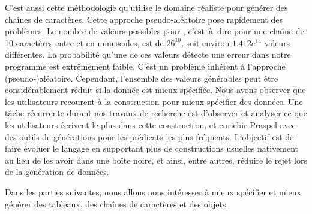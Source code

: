 C'est aussi cette méthodologie qu'utilise le domaine réaliste  pour
générer des chaînes de caractères. Cette approche pseudo-aléatoire pose
rapidement des problèmes. Le nombre de valeurs possibles pour , c'est~à~dire pour une chaîne de 10 caractères entre  et
 en minuscules, est de $26^{10}$, soit environ $1.412e^{14}$ valeurs
différentes. La probabilité qu'une de ces valeurs détecte une erreur dans notre
programme est extrêmement faible. C'est un problème inhérent à l'approche
(pseudo-)aléatoire. Cependant, l'ensemble des valeurs générables peut être
considérablement réduit si la donnée est mieux spécifiée. Nous avons observer
que les utilisateurs recourent à la construction  pour mieux spécifier
des données. Une tâche récurrente durant nos travaux de recherche est d'observer
et analyser ce que les utilisateurs écrivent le plus dans cette construction, et
enrichir Praspel avec des outils de générations pour les prédicats les plus
fréquents. L'objectif est de faire évoluer le langage en supportant plus de
constructions usuelles nativement au lieu de les avoir dans une boîte noire, et
ainsi, entre autres, réduire le rejet lors de la génération de données.

Dans les parties suivantes, nous allons nous intéresser à mieux spécifier et
mieux générer des tableaux, des chaînes de caractères et des objets.
